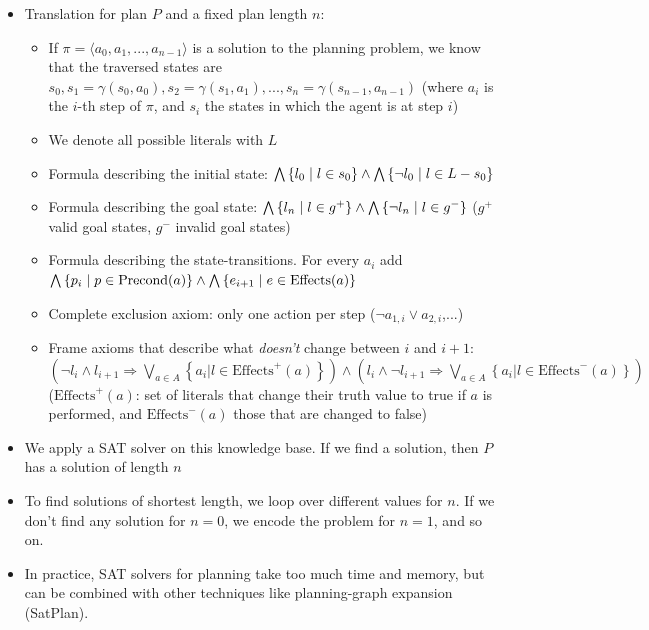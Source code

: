 \begin{itemize}
\begin{minipage}{.3\textwidth}
			\label{fig:kr_sat_planning_example}    
	\end{minipage}
	\item Translation for plan $P$ and a fixed plan length $n$:
	\begin{itemize}
		\item If $\pi=\langle a_0, a_1, ..., a_{n-1}\rangle$ is a solution to the planning problem, we know that the traversed states are $s_0, s_1 = \gamma(s_0, a_0), s_2 = \gamma(s_1, a_1), ..., s_n = \gamma(s_{n-1}, a_{n-1})$ (where $a_i$ is the $i$-th step of $\pi$, and $s_i$ the states in which the agent is at step $i$)
		\item We denote all possible literals with $L$
		\item Formula describing the initial state: $\bigwedge\left\{l_0\hspace{1mm}|\hspace{1mm}l \in s_0\right\} \wedge \bigwedge\left\{\lnot l_0\hspace{1mm}|\hspace{1mm}l \in L-s_0\right\}$
		\item Formula describing the goal state: $\bigwedge\left\{l_n\hspace{1mm}|\hspace{1mm}l \in g^+\right\} \wedge \bigwedge\left\{\lnot l_n\hspace{1mm}|\hspace{1mm}l \in g^{-}\right\}$ ($g^{+}$ valid goal states, $g^{-}$ invalid goal states)
		\item Formula describing the state-transitions. For every $a_i$ add $\bigwedge\left\{p_i\hspace{1mm}|\hspace{1mm}p\in \text{Precond}(a)\right\} \wedge \bigwedge\left\{e_{i+1}\hspace{1mm}|\hspace{1mm}e\in \text{Effects}(a)\right\}$
		\item Complete exclusion axiom: only one action per step ($\lnot a_{1,i} \vee a_{2,i}$,...)
		\item Frame axioms that describe what \textit{doesn't} change between $i$ and $i+1$: $\left(\lnot l_i \wedge l_{i+1} \Rightarrow \bigvee_{a\in A} \left\{ a_i | l \in \text{Effects}^+ (a) \right\} \right) \wedge \left(l_i \wedge \lnot l_{i+1} \Rightarrow \bigvee_{a\in A} \left\{ a_i | l \in \text{Effects}^- (a) \right\} \right)$ ($\text{Effects}^+ (a)$: set of literals that change their truth value to true if $a$ is performed, and $\text{Effects}^- (a)$ those that are changed to false)
	\end{itemize}
	\item We apply a SAT solver on this knowledge base. If we find a solution, then $P$ has a solution of length $n$
	\item To find solutions of shortest length, we loop over different values for $n$. If we don't find any solution for $n=0$, we encode the problem for $n=1$, and so on.
	\item In practice, SAT solvers for planning take too much time and memory, but can be combined with other techniques like planning-graph expansion (SatPlan).
\end{itemize}
